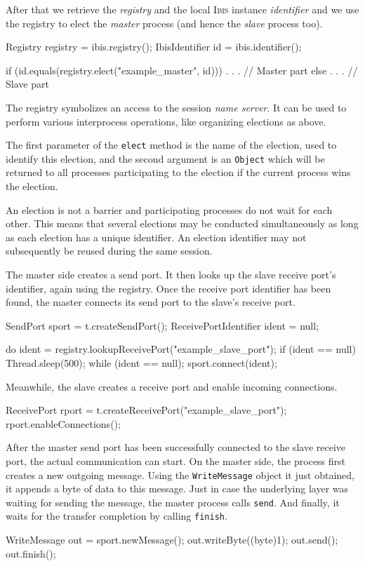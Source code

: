 \documentclass[11pt]{book}
\def\Ibis{\textsc{Ibis}\xspace}
\begin{document}
After that we retrieve the \emph{registry} and the local \Ibis
instance \emph{identifier} and we use the registry to elect the
\emph{master} process (and hence the \emph{slave} process too).
\begin{Miniverb}
      Registry registry = ibis.registry();
      IbisIdentifier id = ibis.identifier();

      if (id.equals(registry.elect("example_master", id))) {
        . . .  // Master part
      } else {
        . . .  // Slave  part
      }
\end{Miniverb}
The registry symbolizes an access to the session \emph{name server}.
It can be used to perform various interprocess operations, like
organizing elections as above.

The first parameter of the \texttt{elect} method is the name of the
election, used to identify this election, and the second argument is
an \texttt{Object} which will be returned to all processes
participating to the election if the current process wins the
election.

An election is not a barrier and participating processes do not wait
for each other. This means that several elections may be conducted
simultaneously as long as each election has a unique identifier. An
election identifier may not subsequently be reused during the same
session.

The master side creates a send port. It then looks up the slave
receive port's identifier, again using the registry. Once the receive
port identifier has been found, the master connects its send port to
the slave's receive port.
\begin{Miniverb}
        SendPort sport = t.createSendPort();
        ReceivePortIdentifier ident = null;

        do {
          ident = registry.lookupReceivePort("example_slave_port");
          if (ident == null) {
            Thread.sleep(500);
          }
        } while (ident == null);
        sport.connect(ident);
\end{Miniverb}

Meanwhile, the slave creates a receive port and enable incoming
connections.
\begin{Miniverb}
        ReceivePort rport = t.createReceivePort("example_slave_port");
        rport.enableConnections();
\end{Miniverb}

After the master send port has been successfully connected to the
slave receive port, the actual communication can start. On the master
side, the process first creates a new outgoing message. Using the
\texttt{WriteMessage} object it just obtained, it appends a byte of
data to this message. Just in case the underlying layer was waiting
for sending the message, the master process calls \texttt{send}. And
finally, it waits for the transfer completion by calling
\texttt{finish}.
\begin{Miniverb}
        WriteMessage out = sport.newMessage();
        out.writeByte((byte)1);
        out.send();
        out.finish();
\end{Miniverb}
\end{document}
